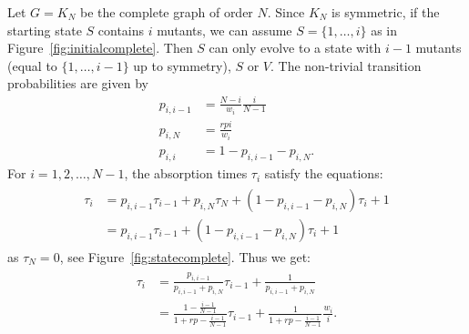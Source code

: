 \documentclass[a4paper,english,10pt]{amsart}
\theoremstyle{definition}
\numberwithin{equation}{section}
\begin{document}
Let $G=K_N$ be the complete graph of order $N$. Since $K_N$ is symmetric, if the starting state $S$ contains $i$ mutants, we can assume $S =\{1,\dots, i\}$ as in  Figure~\ref{fig:initialcomplete}. Then $S$ can only evolve to a state with $i-1$ mutants (equal to $\{1,\dots, i-1\}$ up to symmetry), $S$ or $V$. The non-trivial transition probabilities are given by 
\begin{equation} \label{eq:prob_complete}
\begin{split}
  p_{i,i-1} & =  \frac{\textstyle N-i}{\textstyle w_i} \frac{\textstyle i}{\textstyle N-1}  \\
  p_{i,N} & =  \frac{\textstyle rpi}{\textstyle  w_i}  \\
  p_{i,i}  & =    1 - p_{i,i-1} -  p_{i,N}.
\end{split} 
\end{equation}
For $i=1,2, \ldots, N-1$, the absorption times $\tau_i$ satisfy the equations:
\begin{align} \label{eq:ATcomp}
\begin{split}
\tau_i  & = p_{i,i-1} \tau_{i-1} + p_{i,N} \tau_N + (1 -  p_{i,i-1} -  p_{i,N}) \tau_i + 1 \\
 & = p_{i,i-1} \tau_{i-1} + (1 -  p_{i,i-1} -  p_{i,N}) \tau_i + 1 %
\end{split}
\end{align}
as $\tau_N =0$, see Figure~\ref{fig:statecomplete}. Thus we get:
 \begin{align}  \label{eq:eq_abs_complete}
\begin{split}
     \tau_i & = \frac{p_{i,i-1}}{p_{i,i-1} + p_{i,N}} \tau_{i-1} +  \frac{1}{p_{i,i-1} + p_{i,N}} \\
            & = \frac{1 - \frac{i-1}{N-1}}{1+rp - \frac{i-1}{N-1}} \tau_{i-1} + \frac{1}{1+rp - \frac{i-1}{N-1}}\frac{w_i}{i}. 
\end{split}
 \end{align}
%
\end{document}
